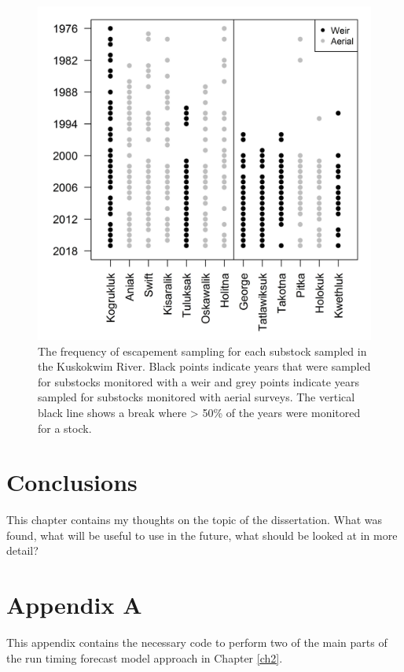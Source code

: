 \documentclass[12pt,]{book}
\theoremstyle{definition}
\theoremstyle{definition}
\theoremstyle{definition}
\theoremstyle{remark}
\begin{document}
\clearpage

\begin{figure}
  \centering
  \includegraphics{img/Ch4/obs-freq.jpg}
  \caption{The frequency of escapement sampling for each substock sampled in the Kuskokwim River. Black points indicate years that were sampled for substocks monitored with a weir and grey points indicate years sampled for substocks monitored with aerial surveys. The vertical black line shows a break where > 50\% of the years were monitored for a stock.}
  \label{fig:obs-freq}
\end{figure}

\chapter{Conclusions}\label{ch5}

This chapter contains my thoughts on the topic of the dissertation. What
was found, what will be useful to use in the future, what should be
looked at in more detail?

\chapter*{Appendix A}\label{appendix-a}

\noindent
This appendix contains the necessary code to perform two of the main
parts of the run timing forecast model approach in Chapter \ref{ch2}.
\end{document}
